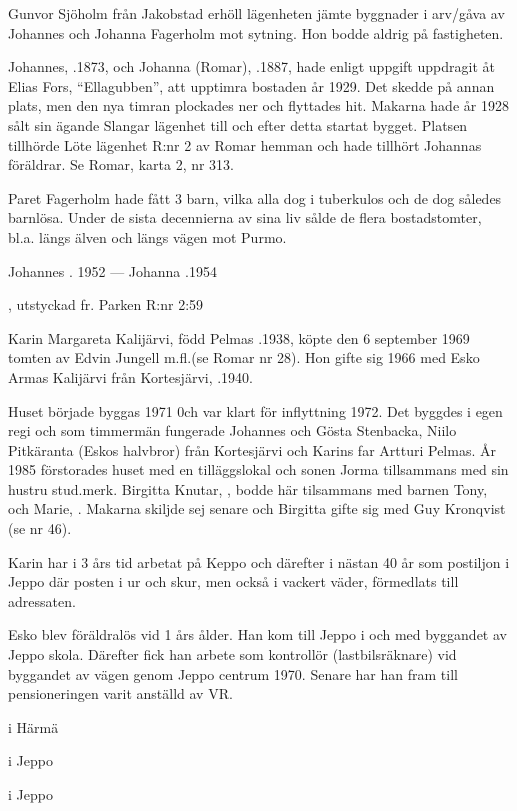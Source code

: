 Gunvor Sjöholm från Jakobstad erhöll lägenheten jämte byggnader i arv/gåva av Johannes och Johanna Fagerholm mot sytning. Hon bodde aldrig på fastigheten.


Johannes, .1873, och Johanna (Romar), .1887, hade enligt uppgift uppdragit åt Elias Fors, ``Ellagubben'', att upptimra bostaden år 1929. Det skedde på annan plats, men den nya timran plockades ner och flyttades hit. Makarna hade år 1928 sålt sin ägande Slangar lägenhet till  och efter detta startat bygget. Platsen tillhörde Löte lägenhet R:nr 2 av Romar hemman och hade tillhört Johannas föräldrar. Se Romar, karta 2, nr 313.

Paret Fagerholm hade fått 3 barn, vilka alla dog i tuberkulos och de dog således barnlösa. Under de sista decennierna av sina liv sålde de flera bostadstomter,  bl.a. längs älven och längs vägen mot Purmo.

Johannes . 1952  ---  Johanna .1954



, utstyckad fr. Parken R:nr 2:59



Karin Margareta Kalijärvi, född Pelmas .1938, köpte den 6 september 1969 tomten av Edvin Jungell m.fl.(se Romar nr 28). Hon gifte sig 1966 med Esko Armas Kalijärvi från Kortesjärvi, .1940.

Huset började byggas 1971 0ch var klart för inflyttning 1972. Det byggdes i egen regi och som timmermän fungerade Johannes och Gösta Stenbacka, Niilo Pitkäranta (Eskos halvbror) från Kortesjärvi och Karins far Artturi Pelmas. År 1985 förstorades huset med en tilläggslokal och sonen Jorma tillsammans med sin hustru stud.merk. Birgitta Knutar, , bodde här tilsammans med barnen Tony, 
och Marie, . Makarna skiljde sej senare och Birgitta gifte sig med Guy Kronqvist (se nr 46).

Karin har i 3 års tid arbetat på Keppo och därefter i nästan 40 år som postiljon i Jeppo där posten i ur och skur, men också i vackert väder, förmedlats till adressaten.

Esko blev föräldralös vid 1 års ålder. Han kom till Jeppo i och med byggandet av Jeppo skola. Därefter fick han arbete som kontrollör (lastbilsräknare) vid byggandet av vägen genom Jeppo centrum 1970. Senare har han fram till pensioneringen varit anställd av VR.
\begin{jhchildren}
  \item {} i Härmä
  \item {} i Jeppo
  \item {} i Jeppo
\end{jhchildren}

